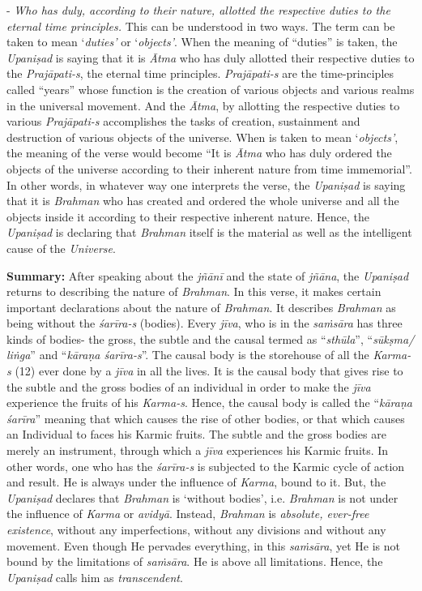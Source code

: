 - \emph{Who has duly, according to their nature, allotted the respective duties to the eternal time principles.} This can be understood in two ways. The term  can be taken to mean `\emph{duties'} or `\emph{objects'}. When the meaning of ``duties'' is taken, the \emph{Upaniṣad} is saying that it is \emph{Ātma} who has duly allotted their respective duties to the \emph{Prajāpati-s}, the eternal time principles. \emph{Prajāpati-s} are the time-principles called ``years'' whose function is the creation of various objects and various realms in the universal movement. And the \emph{Ātma}, by allotting the respective duties to various \emph{Prajāpati-s} accomplishes the tasks of creation, sustainment and destruction of various objects of the universe. When  is taken to mean `\emph{objects'}, the meaning of the verse would become ``It is \emph{Ātma} who has duly ordered the objects of the universe according to their inherent nature from time immemorial''. In other words, in whatever way one interprets the verse, the \emph{Upaniṣad} is saying that it is \emph{Brahman} who has created and ordered the whole universe and all the objects inside it according to their respective inherent nature. Hence, the \emph{Upaniṣad} is declaring that \emph{Brahman} itself is the material as well as the intelligent cause of the \emph{Universe}.

\textbf{Summary:} After speaking about the \emph{jñānī} and the state of \emph{jñāna}, the \emph{Upaniṣad} returns to describing the nature of \emph{Brahman}. In this verse, it makes certain important declarations about the nature of \emph{Brahman}. It describes \emph{Brahman} as being without the \emph{śarīra-s} (bodies). Every \emph{jīva}, who is in the \emph{saṁsāra} has three kinds of bodies- the gross, the subtle and the causal termed as ``\emph{sthūla}'', ``\emph{sūkṣma/ liṅga}'' and ``\emph{kāraṇa śarīra-s}''. The causal body is the storehouse of all the \emph{Karma-s} (12) ever done by a \emph{jīva} in all the lives. It is the causal body that gives rise to the subtle and the gross bodies of an individual in order to make the \emph{jīva} experience the fruits of his \emph{Karma-s}. Hence, the causal body is called the ``\emph{kāraṇa śarīra}'' meaning that which causes the rise of other bodies, or that which causes an Individual to faces his Karmic fruits. The subtle and the gross bodies are merely an instrument, through which a \emph{jīva} experiences his Karmic fruits. In other words, one who has the \emph{śarīra-s} is subjected to the Karmic cycle of action and result. He is always under the influence of \emph{Karma}, bound to it. But, the \emph{Upaniṣad} declares that \emph{Brahman} is `without bodies', i.e. \emph{Brahman} is not under the influence of \emph{Karma} or \emph{avidyā}. Instead, \emph{Brahman} is \emph{absolute, ever-free existence}, without any imperfections, without any divisions and without any movement. Even though He pervades everything, in this \emph{saṁsāra}, yet He is not bound by the limitations of \emph{saṁsāra}. He is above all limitations. Hence, the \emph{Upaniṣad} calls him as \emph{transcendent}.


